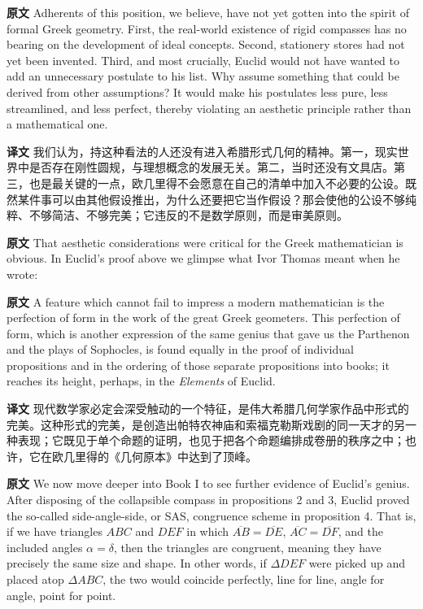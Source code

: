 \documentclass[UTF8,zihao=-4]{ctexart}
\newcommand{\BodyFont}{\fontsize{10.5pt}{15.5pt}\selectfont}
\renewenvironment{quote}{\par\noindent\begingroup\BodyFont}{\par\endgroup}
\begin{document}
\noindent\textbf{原文} Adherents of this position, we believe, have not yet gotten into the spirit of formal Greek geometry. First, the real-world existence of rigid compasses has no bearing on the development of ideal concepts. Second, stationery stores had not yet been invented. Third, and most crucially, Euclid would not have wanted to add an unnecessary postulate to his list. Why assume something that could be derived from other assumptions? It would make his postulates less pure, less streamlined, and less perfect, thereby violating an aesthetic principle rather than a mathematical one.

\noindent\textbf{译文} 我们认为，持这种看法的人还没有进入希腊形式几何的精神。第一，现实世界中是否存在刚性圆规，与理想概念的发展无关。第二，当时还没有文具店。第三，也是最关键的一点，欧几里得不会愿意在自己的清单中加入不必要的公设。既然某件事可以由其他假设推出，为什么还要把它当作假设？那会使他的公设不够纯粹、不够简洁、不够完美；它违反的不是数学原则，而是审美原则。

\noindent\textbf{原文} That aesthetic considerations were critical for the Greek mathematician is obvious. In Euclid's proof above we glimpse what Ivor Thomas meant when he wrote:

\begin{quote}
\noindent\textbf{原文} A feature which cannot fail to impress a modern mathematician is the perfection of form in the work of the great Greek geometers. This perfection of form, which is another expression of the same genius that gave us the Parthenon and the plays of Sophocles, is found equally in the proof of individual propositions and in the ordering of those separate propositions into books; it reaches its height, perhaps, in the \textit{Elements} of Euclid.

\noindent\textbf{译文} 现代数学家必定会深受触动的一个特征，是伟大希腊几何学家作品中形式的完美。这种形式的完美，是创造出帕特农神庙和索福克勒斯戏剧的同一天才的另一种表现；它既见于单个命题的证明，也见于把各个命题编排成卷册的秩序之中；也许，它在欧几里得的《几何原本》中达到了顶峰。
\end{quote}

\noindent\textbf{原文} We now move deeper into Book I to see further evidence of Euclid's genius. After disposing of the collapsible compass in propositions 2 and 3, Euclid proved the so-called side-angle-side, or SAS, congruence scheme in proposition 4. That is, if we have triangles $ABC$ and $DEF$ in which $\overline{AB}=\overline{DE}$, $\overline{AC}=\overline{DF}$, and the included angles $\alpha=\delta$, then the triangles are congruent, meaning they have precisely the same size and shape. In other words, if $\Delta DEF$ were picked up and placed atop $\Delta ABC$, the two would coincide perfectly, line for line, angle for angle, point for point.
\end{document}
